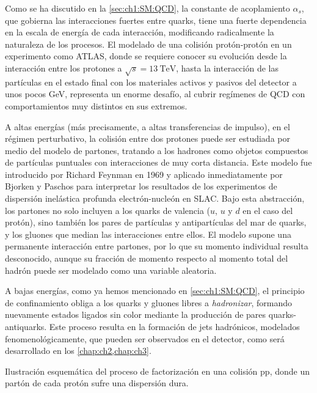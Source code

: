 Como se ha discutido en la \cref{sec:ch1:SM:QCD}, la constante de acoplamiento $\alpha_s$, que gobierna las interacciones fuertes entre quarks, tiene una fuerte dependencia en la escala de energía de cada interacción, modificando radicalmente la naturaleza de los procesos. El modelado de una colisión protón-protón en un experimento como ATLAS, donde se requiere conocer su evolución desde la interacción entre los protones a $\sqrt{s} = \SI{13}{\TeV}$, hasta la interacción de las partículas en el estado final con los materiales activos y pasivos del detector a unos pocos \si{\GeV}, representa un enorme desafío, al cubrir regímenes de QCD con comportamientos muy distintos en sus extremos.

A altas energías (más precisamente, a altas transferencias de impulso), en el régimen perturbativo, la colisión entre dos protones puede ser estudiada por medio del modelo de partones, tratando a los hadrones como objetos compuestos de partículas puntuales con interacciones de muy corta distancia. Este modelo fue introducido por Richard Feynman en 1969 y aplicado inmediatamente por Bjorken y Paschos para interpretar los resultados de los experimentos de dispersión inelástica profunda electrón-nucleón en SLAC. Bajo esta abstracción, los partones no solo incluyen a los quarks de valencia ($u$, $u$ y $d$ en el caso del protón), sino también los pares de partículas y antipartículas del mar de quarks, y los gluones que median las interacciones entre ellos. El modelo supone una permanente interacción entre partones, por lo que su momento individual resulta desconocido, aunque su fracción de momento respecto al momento total del hadrón puede ser modelado como una variable aleatoria.

A bajas energías, como ya hemos mencionado en \ref{sec:ch1:SM:QCD}, el principio de confinamiento obliga a los quarks y gluones libres a \textit{hadronizar}, formando nuevamente estados ligados sin color mediante la producción de pares quarks-antiquarks. Este proceso resulta en la formación de jets hadrónicos, modelados fenomenológicamente, que pueden ser observados en el detector, como será desarrollado en los \cref{chap:ch2,chap:ch3}.

\begin{marginfigure}
  \centering
  
  \caption{Ilustración esquemática del proceso de factorización en una colisión pp, donde un partón de cada protón sufre una dispersión dura.}
  \label{fig:ch1:SM:pp_interactions:factorization}
\end{marginfigure}

